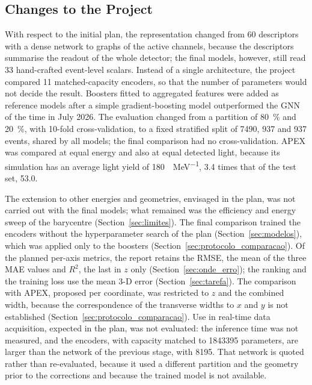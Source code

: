 \subsection{Changes to the Project}
\label{sec:alteracoes}

With respect to the initial plan, the representation changed from \num{60} descriptors with a dense network to graphs of the active channels, because the descriptors summarise the readout of the whole detector; the final models, however, still read \num{33} hand-crafted event-level scalars. Instead of a single architecture, the project compared \num{11} matched-capacity encoders, so that the number of parameters would not decide the result. Boosters fitted to aggregated features were added as reference models after a simple gradient-boosting model outperformed the GNN of the time in July 2026. The evaluation changed from a partition of \qty{80}{\percent} and \qty{20}{\percent}, with \num{10}-fold cross-validation, to a fixed stratified split of \num{7490}, \num{937} and \num{937} events, shared by all models; the final comparison had no cross-validation. APEX was compared at equal energy and also at equal detected light, because its simulation has an average light yield of \qty{180}{\pe\per\MeV}, \num{3.4} times that of the test set, \num{53.0}.

The extension to other energies and geometries, envisaged in the plan, was not carried out with the final models; what remained was the efficiency and energy sweep of the barycentre (Section~\ref{sec:limites}). The final comparison trained the encoders without the hyperparameter search of the plan (Section~\ref{sec:modelos}), which was applied only to the boosters (Section~\ref{sec:protocolo_comparacao}). Of the planned per-axis metrics, the report retains the RMSE, the mean of the three MAE values and $R^2$, the last in $z$ only (Section~\ref{sec:onde_erro}); the ranking and the training loss use the mean 3-D error (Section~\ref{sec:tarefa}). The comparison with APEX, proposed per coordinate, was restricted to $z$ and the combined width, because the correspondence of the transverse widths to $x$ and $y$ is not established (Section~\ref{sec:protocolo_comparacao}). Use in real-time data acquisition, expected in the plan, was not evaluated: the inference time was not measured, and the encoders, with capacity matched to \num{1843395} parameters, are larger than the network of the previous stage, with \num{8195}. That network is quoted rather than re-evaluated, because it used a different partition and the geometry prior to the corrections and because the trained model is not available.
